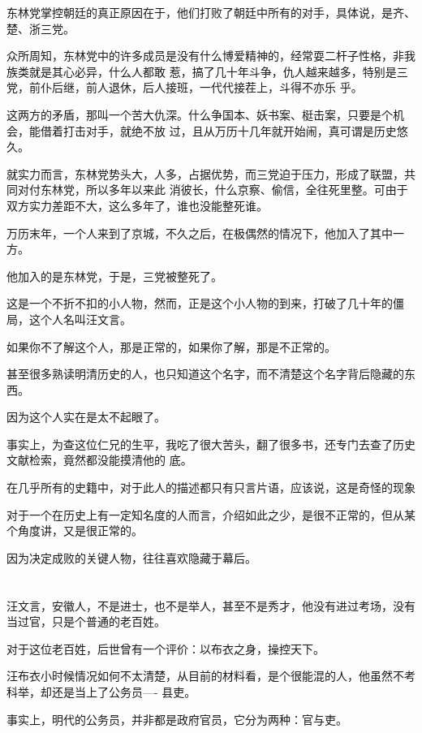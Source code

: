 \documentclass[11pt,a4paper,onecolumn]{article}
\begin{document}
东林党掌控朝廷的真正原因在于，他们打败了朝廷中所有的对手，具体说，是齐、楚、浙三党。

众所周知，东林党中的许多成员是没有什么博爱精神的，经常耍二杆子性格，非我族类就是其心必异，什么人都敢
惹，搞了几十年斗争，仇人越来越多，特别是三党，前仆后继，前人退休，后人接班，一代代接茬上，斗得不亦乐
乎。

这两方的矛盾，那叫一个苦大仇深。什么争国本、妖书案、梃击案，只要是个机会，能借着打击对手，就绝不放
过，且从万历十几年就开始闹，真可谓是历史悠久。

就实力而言，东林党势头大，人多，占据优势，而三党迫于压力，形成了联盟，共同对付东林党，所以多年以来此
消彼长，什么京察、偷信，全往死里整。可由于双方实力差距不大，这么多年了，谁也没能整死谁。

万历末年，一个人来到了京城，不久之后，在极偶然的情况下，他加入了其中一方。

他加入的是东林党，于是，三党被整死了。

这是一个不折不扣的小人物，然而，正是这个小人物的到来，打破了几十年的僵局，这个人名叫汪文言。

如果你不了解这个人，那是正常的，如果你了解，那是不正常的。

甚至很多熟读明清历史的人，也只知道这个名字，而不清楚这个名字背后隐藏的东西。

因为这个人实在是太不起眼了。

事实上，为查这位仁兄的生平，我吃了很大苦头，翻了很多书，还专门去查了历史文献检索，竟然都没能摸清他的
底。

在几乎所有的史籍中，对于此人的描述都只有只言片语，应该说，这是奇怪的现象

对于一个在历史上有一定知名度的人而言，介绍如此之少，是很不正常的，但从某个角度讲，又是很正常的。

因为决定成败的关键人物，往往喜欢隐藏于幕后。

\section[\thesection]{}

汪文言，安徽人，不是进士，也不是举人，甚至不是秀才，他没有进过考场，没有当过官，只是个普通的老百姓。

对于这位老百姓，后世曾有一个评价：以布衣之身，操控天下。

汪布衣小时候情况如何不太清楚，从目前的材料看，是个很能混的人，他虽然不考科举，却还是当上了公务员----
县吏。

事实上，明代的公务员，并非都是政府官员，它分为两种：官与吏。
\end{document}
